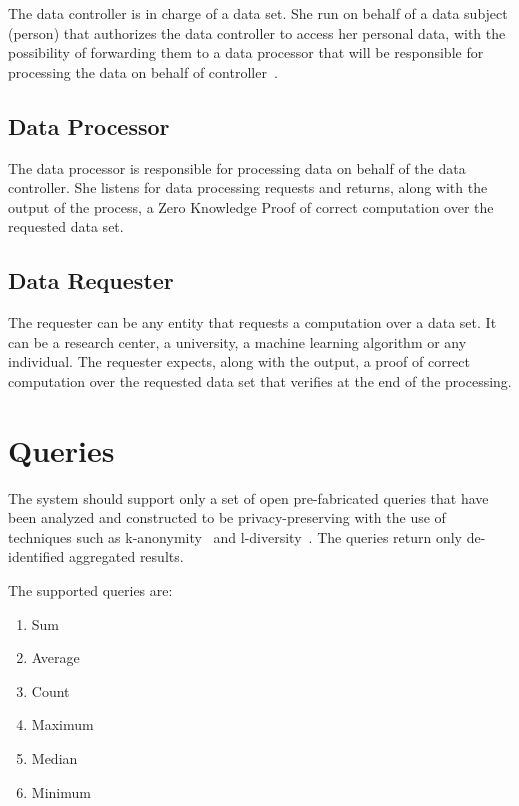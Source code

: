 The data controller is in charge of a data set. She run on behalf of a data subject (person)
that authorizes the data controller to access her personal data, with the possibility of forwarding
them to a data processor that will be responsible for processing the data on behalf of controller~\cite{DBLP:journals/corr/NeisseSF17}.

\subsection{Data Processor}
\label{solution:entities:data_processor}

The data processor is responsible for processing data on behalf of the data controller. She listens for data processing requests and returns, along with the output of the process, a Zero Knowledge Proof of correct computation over the requested data set.

\subsection{Data Requester}
\label{solution:entities:data_req}

The requester can be any entity that requests a computation over a data set. It can be a research center, a university, a machine learning algorithm or any individual. The requester expects, along with the output, a proof of correct computation over the requested data set that verifies at the end of the processing.

\section{Queries}
\label{solution:queries}

The system should support only a set of open pre-fabricated queries that have been analyzed and constructed to be privacy-preserving with the use of techniques such as k-anonymity~\cite{Samarati98protectingprivacy} and l-diversity~\cite{Aggarwal2008}. The queries return only de-identified aggregated results.

The supported queries are:

\begin{enumerate}
  \item Sum
  \item Average
  \item Count
  \item Maximum
  \item Median
  \item Minimum
\end{enumerate}


